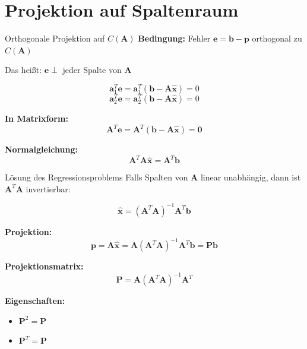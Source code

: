 \documentclass[a4paper, fontsize=7pt]{scrartcl}
\begin{document}
\section{Projektion auf Spaltenraum}

\begin{mainbox}{Orthogonale Projektion auf $C(\mathbf{A})$}
\textbf{Bedingung:} Fehler $\mathbf{e} = \mathbf{b} - \mathbf{p}$ orthogonal zu $C(\mathbf{A})$

Das heißt: $\mathbf{e} \perp$ jeder Spalte von $\mathbf{A}$

$$\mathbf{a}_1^T\mathbf{e} = \mathbf{a}_1^T(\mathbf{b} - \mathbf{A}\hat{\mathbf{x}}) = 0$$
$$\mathbf{a}_2^T\mathbf{e} = \mathbf{a}_2^T(\mathbf{b} - \mathbf{A}\hat{\mathbf{x}}) = 0$$

\textbf{In Matrixform:}
$$\mathbf{A}^T\mathbf{e} = \mathbf{A}^T(\mathbf{b} - \mathbf{A}\hat{\mathbf{x}}) = \mathbf{0}$$

\textbf{Normalgleichung:}
$$\mathbf{A}^T\mathbf{A}\hat{\mathbf{x}} = \mathbf{A}^T\mathbf{b}$$
\end{mainbox}

\begin{mainbox}{Lösung des Regressionsproblems}
Falls Spalten von $\mathbf{A}$ linear unabhängig, dann ist $\mathbf{A}^T\mathbf{A}$ invertierbar:

$$\hat{\mathbf{x}} = (\mathbf{A}^T\mathbf{A})^{-1}\mathbf{A}^T\mathbf{b}$$

\textbf{Projektion:}
$$\mathbf{p} = \mathbf{A}\hat{\mathbf{x}} = \mathbf{A}(\mathbf{A}^T\mathbf{A})^{-1}\mathbf{A}^T\mathbf{b} = \mathbf{Pb}$$

\textbf{Projektionsmatrix:}
$$\mathbf{P} = \mathbf{A}(\mathbf{A}^T\mathbf{A})^{-1}\mathbf{A}^T$$

\textbf{Eigenschaften:}
\begin{itemize}
    \item $\mathbf{P}^2 = \mathbf{P}$
    \item $\mathbf{P}^T = \mathbf{P}$
\end{itemize}
\end{mainbox}
\end{document}
